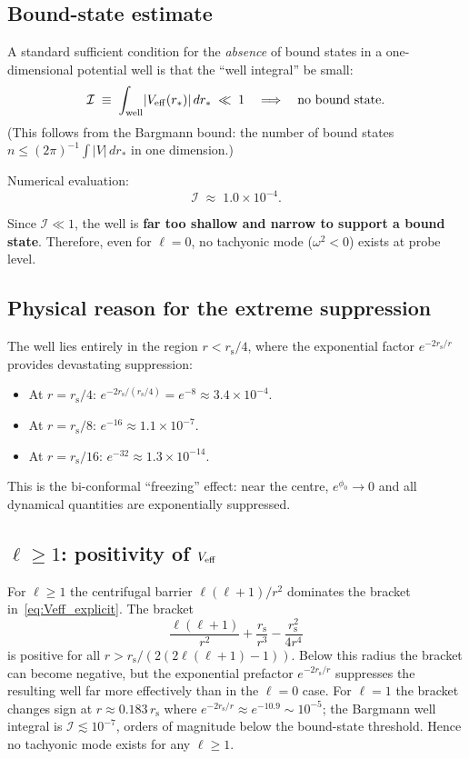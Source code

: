\documentclass[11pt]{article}
\newcommand{\rs}{r_{\mathrm{s}}}
\begin{document}
\subsection{Bound-state estimate}

A standard sufficient condition for the \emph{absence} of bound states
in a one-dimensional potential well is that the ``well integral'' be
small:
\begin{equation}
\mathcal{I}\;\equiv\;\int_{\text{well}}\!|V_{\rm eff}(r_*)|\,dr_*
\;\ll\;1
\quad\Longrightarrow\quad
\text{no bound state.}
\end{equation}
(This follows from the Bargmann bound: the number of bound states
$n\leq (2\pi)^{-1}\int|V|\,dr_*$ in one dimension.)

Numerical evaluation:
\begin{equation}
\mathcal{I}\;\approx\;1.0\times 10^{-4}.
\end{equation}

Since $\mathcal{I}\ll 1$, the well is \textbf{far too shallow and
narrow to support a bound state}.  Therefore, even for $\ell=0$,
no tachyonic mode ($\omega^2<0$) exists at probe level.

\subsection{Physical reason for the extreme suppression}

The well lies entirely in the region $r<\rs/4$, where the exponential
factor $e^{-2\rs/r}$ provides devastating suppression:
\begin{itemize}
\item At $r=\rs/4$: $e^{-2\rs/(\rs/4)}=e^{-8}\approx 3.4\times 10^{-4}$.
\item At $r=\rs/8$: $e^{-16}\approx 1.1\times 10^{-7}$.
\item At $r=\rs/16$: $e^{-32}\approx 1.3\times 10^{-14}$.
\end{itemize}
This is the bi-conformal ``freezing'' effect: near the centre,
$e^{\phi_0}\to 0$ and all dynamical quantities are exponentially
suppressed.

\subsection{$\ell\geq 1$: positivity of $V_{\rm eff}$}

For $\ell\geq 1$ the centrifugal barrier $\ell(\ell+1)/r^2$
dominates the bracket in~\eqref{eq:Veff_explicit}.  The bracket
\[
\frac{\ell(\ell+1)}{r^2}+\frac{\rs}{r^3}-\frac{\rs^2}{4r^4}
\]
is positive for all $r>\rs/(2(2\ell(\ell+1)-1))$.  Below this
radius the bracket can become negative, but the exponential
prefactor $e^{-2\rs/r}$ suppresses the resulting well far more
effectively than in the $\ell=0$ case.  For $\ell=1$ the bracket
changes sign at $r\approx 0.183\,\rs$ where $e^{-2\rs/r}\approx
e^{-10.9}\sim 10^{-5}$; the Bargmann well integral is
$\mathcal{I}\lesssim 10^{-7}$, orders of magnitude below the
bound-state threshold.  Hence no tachyonic mode exists for any
$\ell\geq 1$.
\end{document}
